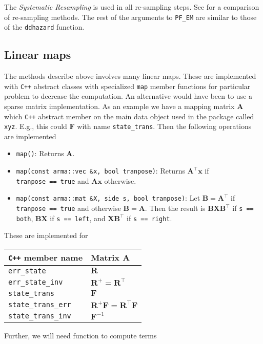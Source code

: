 \documentclass[notitlepage]{article}
\renewcommand{\vec}[1]{\bm{#1}}
\newcommand{\mat}[1]{\mathbf{#1}}
\begin{document}
The \emph{Systematic Resampling} \citep{kitagawa96} is used in all re-sampling steps. See \cite{douc05} for a comparison of re-sampling methods. The rest of the arguments to \verb|PF_EM| are similar to those of the \verb|ddhazard| function.

\subsection{Linear maps}
The methods describe above involves many linear maps. These are implemented with \verb|C++| abstract classes with specialized \verb|map| member functions for particular problem to decrease the computation. An alternative would have been to use a sparse matrix implementation. As an example we have a mapping matrix $\mat{A}$ which \verb|C++| abstract member on the main data object used in the package called \verb|xyz|. E.g., this could $\mat{F}$ with name \verb|state_trans|. Then the following operations are implemented %
%
\begin{itemize}
\item \verb|map()|: Returns $\mat{A}$.
%
\item \verb|map(const arma::vec &x, bool tranpose)|: Returns $\mat{A}^\top\vec{x}$ if \\ \verb|tranpose == true| and $\mat{A}\vec{x}$ otherwise.
%
\item \verb|map(const arma::mat &X, side s, bool tranpose)|: Let $\mat{B}=\mat{A}^\top$ if  \verb|tranpose == true| and otherwise $\mat{B}=\mat{A}$. Then the result is  $\mat{B}\mat{X}\mat{B}^\top$ if \verb|s == both|, $\mat{B}\mat{X}$ if \verb|s == left|, and $\mat{X}\mat{B}^\top$ if \verb|s == right|.
\end{itemize}%
%
These are implemented for %
%
\begin{center}
\begin{tabular}{ l l } 
 \verb|C++| member name & Matrix $\mat{A}$ \\
 \hline
 \verb|err_state|               & $\mat{R}$ \\
 \verb|err_state_inv|           & $\mat{R}^{+} = \mat{R}^\top$ \\
 \verb|state_trans|             & $\mat{F}$ \\
 \verb|state_trans_err|         & $\mat{R}^{+}\mat{F} = \mat{R}^\top\mat{F}$ \\
 \verb|state_trans_inv|         & $\mat{F}^{-1}$
\end{tabular}
\end{center}%
%
Further, we will need function to compute terms %
\end{document}
